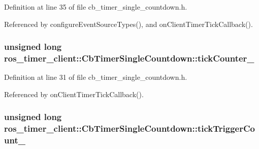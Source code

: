 Definition at line 35 of file cb\+\_\+timer\+\_\+single\+\_\+countdown.\+h.



Referenced by configure\+Event\+Source\+Types(), and on\+Client\+Timer\+Tick\+Callback().

\subsubsection[{\texorpdfstring{tick\+Counter\+\_\+}{tickCounter_}}]{\setlength{\rightskip}{0pt plus 5cm}unsigned long ros\+\_\+timer\+\_\+client\+::\+Cb\+Timer\+Single\+Countdown\+::tick\+Counter\+\_\+\hspace{0.3cm}{\ttfamily [private]}}\hypertarget{classros__timer__client_1_1CbTimerSingleCountdown_a49fdd585034d79ada6a788661e83c456}{}\label{classros__timer__client_1_1CbTimerSingleCountdown_a49fdd585034d79ada6a788661e83c456}


Definition at line 31 of file cb\+\_\+timer\+\_\+single\+\_\+countdown.\+h.



Referenced by on\+Client\+Timer\+Tick\+Callback().

\subsubsection[{\texorpdfstring{tick\+Trigger\+Count\+\_\+}{tickTriggerCount_}}]{\setlength{\rightskip}{0pt plus 5cm}unsigned long ros\+\_\+timer\+\_\+client\+::\+Cb\+Timer\+Single\+Countdown\+::tick\+Trigger\+Count\+\_\+\hspace{0.3cm}{\ttfamily [private]}}\hypertarget{classros__timer__client_1_1CbTimerSingleCountdown_a42b648f3b03508443b44b150cf7246f5}{}\label{classros__timer__client_1_1CbTimerSingleCountdown_a42b648f3b03508443b44b150cf7246f5}


